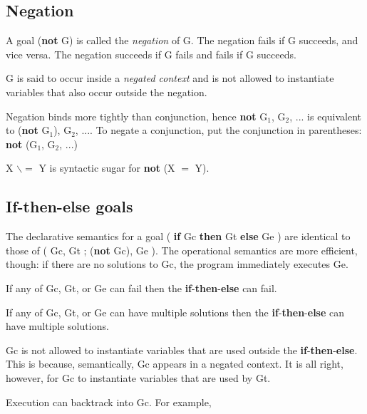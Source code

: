 \documentclass[a4paper,11pt,notitlepage,onecolumn]{book}
\begin{document}
\subsection*{Negation}

A goal \textsf{(\textbf{not} G)} is called the \emph{negation} of \textsf{G}.  The negation fails
if \textsf{G} succeeds, and vice versa.  The negation succeeds if \textsf{G} fails and
fails if \textsf{G} succeeds.

\Note \textsf{G} is said to occur inside a \emph{negated context} and is
not allowed to instantiate variables that also occur outside the negation.

\Note Negation binds more tightly than conjunction, hence
\textsf{\textbf{not} G$_{1}$, G$_{2}$, ...} is equivalent to \textsf{(\textbf{not} G$_{1}$), G$_{2}$, ...}.  To negate a
conjunction, put the conjunction in parentheses: \textsf{\textbf{not} (G$_{1}$, G$_{2}$, ...)}

\Note \textsf{X {\ensuremath{\backslash}}{\ensuremath{=}} Y} is syntactic sugar for \textsf{\textbf{not} (X {\ensuremath{=}} Y)}.

\subsection*{If-then-else goals}

The declarative semantics for a goal \textsf{( \textbf{if} Gc \textbf{then} Gt \textbf{else} Ge )} are
identical to those of \textsf{( Gc, Gt ; (\textbf{not} Gc), Ge )}.  The operational
semantics are more efficient, though: if there are no solutions to \textsf{Gc},
the program immediately executes \textsf{Ge}.

If any of \textsf{Gc}, \textsf{Gt}, or \textsf{Ge} can fail then the \textsf{\textbf{if}}-\textsf{\textbf{then}}-\textsf{\textbf{else}} can fail.

If any of \textsf{Gc}, \textsf{Gt}, or \textsf{Ge} can have multiple solutions then the
\textsf{\textbf{if}}-\textsf{\textbf{then}}-\textsf{\textbf{else}} can have multiple solutions.

\Note \textsf{Gc} is not allowed to instantiate variables that are used outside the
\textsf{\textbf{if}}-\textsf{\textbf{then}}-\textsf{\textbf{else}}.  This is because, semantically, \textsf{Gc} appears in a
negated context.  It is all right, however, for \textsf{Gc} to instantiate
variables that are used by \textsf{Gt}.

\Note Execution can backtrack into \textsf{Gc}.  For example,
\end{document}
